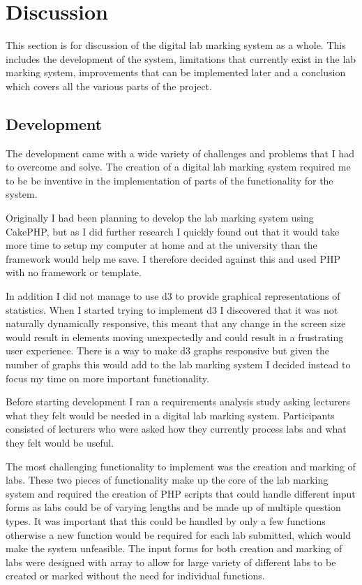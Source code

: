 \documentclass[11pt]{report}
\begin{document}
\newpage
\chapter{Discussion}

This section is for discussion of the digital lab marking system as a whole. This includes the development of the system, limitations that currently exist in the lab marking system, improvements that can be implemented later and a conclusion which covers all the various parts of the project.

\section{Development}

The development came with a wide variety of challenges and problems that I had to overcome and solve. The creation of a digital lab marking system required me to be be inventive in the implementation of parts of the functionality for the system.

Originally I had been planning to develop the lab marking system using CakePHP, but as I did further research I quickly found out that it would take more time to setup my computer at home and at the university than the framework would help me save. I therefore decided against this and used PHP with no framework or template.

In addition I did not manage to use d3 to provide graphical representations of statistics. When I started trying to implement d3 I discovered that it was not naturally dynamically responsive, this meant that any change in the screen size would result in elements moving unexpectedly and could result in a frustrating user experience. There is a way to make d3 graphs responsive but given the number of graphs this would add to the lab marking system I decided instead to focus my time on more important functionality. 

Before starting development I ran a requirements analysis study asking lecturers what they felt would be needed in a digital lab marking system. Participants consisted of lecturers who were asked how they currently process labs and what they felt  would be useful.

The most challenging functionality to implement was the creation and marking of labs. These two pieces of functionality make up the core of the lab marking system and required the creation of PHP scripts that could handle different input forms as labs could be of varying lengths and be made up of multiple question types. It was important that this could be handled by only a few functions otherwise a new function would be required for each lab submitted, which would make the system unfeasible. The input forms for both creation and marking of labs were designed with array to allow for large variety of different labs to be created or marked without the need for individual functions.  
\end{document}
